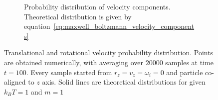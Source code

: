 \begin{figure}[h]
\begin{subfigure}[t]{0.45\textwidth}
		\captionsetup{justification=centering, width=0.9\textwidth}
		\caption{Probability distribution of velocity components. Theoretical distribution is given by equation~\eqref{eq:maxwell_boltzmann_velocity_components}}
	\end{subfigure}
	\captionsetup{justification=centering, width=0.9\textwidth}
	\caption{Translational and rotational velocity probability distribution. Points are obtained numerically, with averaging over $20000$ samples at time $t = 100$. Every sample started from $r_z = v_z = \omega_i = 0$ and particle co-aligned to $z$ axis. Solid lines are theoretical distributions for given $k_BT = 1$ and $m = 1$}
	\label{fig:velocity_distributions}
\end{figure}